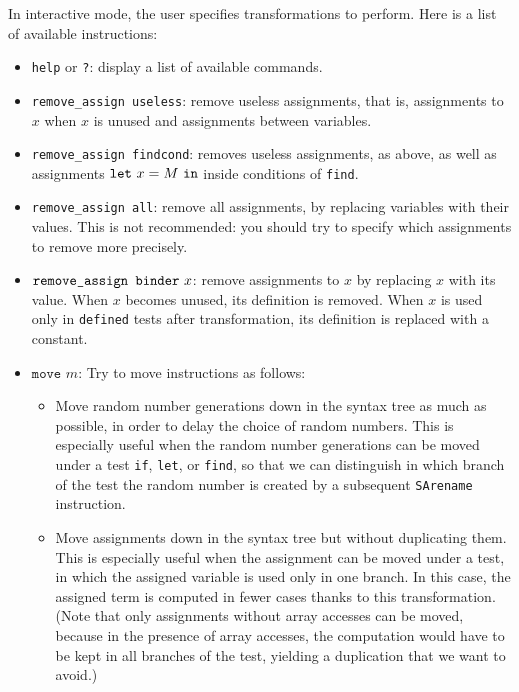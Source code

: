 \documentclass{article}
\begin{document}
In interactive mode, the user specifies transformations to perform.
Here is a list of available instructions:
\begin{itemize}

\item \texttt{help} or \texttt{?}: display a list of available commands.

\item \texttt{remove\string_assign useless}: remove useless assignments,
that is, assignments to $x$ when $x$ is unused and assignments
between variables.

\item \texttt{remove\string_assign findcond}: removes useless assignments,
as above, as well as assignments ${\tt let}\ x = M\ {\tt in}$ inside
conditions of {\tt find}. 

\item \texttt{remove\string_assign all}: remove all assignments,
by replacing variables with their values. This is not recommended:
you should try to specify which assignments to remove more precisely.

\item $\texttt{remove\string_assign binder}\ x$: remove assignments
to $x$ by replacing $x$ with its value. When $x$ becomes unused,
its definition is removed. When $x$ is used only in \texttt{defined} 
tests after transformation, its definition is replaced with 
a constant.

\item $\texttt{move }m$: Try to move instructions as follows:
\begin{itemize}

\item Move random number generations down in the syntax tree as much
  as possible, in order to delay the choice of random numbers. This is
  especially useful when the random number generations can be moved
  under a test {\tt if}, {\tt let}, or {\tt find}, so that we can
  distinguish in which branch of the test the random number is created
  by a subsequent \texttt{SArename} instruction.

\item Move assignments down in the syntax tree but without duplicating
  them. This is especially useful when the assignment can be moved
  under a test, in which the assigned variable is used only in one
  branch. In this case, the assigned term is computed in fewer cases
  thanks to this transformation.
  (Note that only assignments without array accesses can be moved,
  because in the presence of array accesses, the computation would have
  to be kept in all branches of the test, yielding a duplication that 
  we want to avoid.)


\end{itemize}
\end{itemize}
\end{document}
